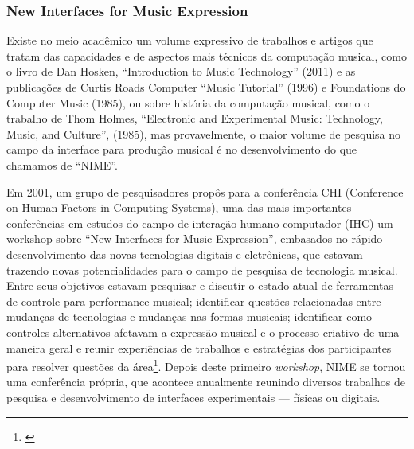 {%

\subsubsection{New Interfaces for Music Expression}



Existe no meio acadêmico um volume expressivo de trabalhos e artigos que tratam das capacidades e de aspectos mais técnicos da computação musical, como o livro de Dan Hosken, ``Introduction to Music Technology'' (2011) e as publicações de Curtis Roads Computer ``Music Tutorial'' (1996) e Foundations do Computer Music (1985), ou sobre história da computação musical, como o trabalho de Thom Holmes, ``Electronic and Experimental Music: Technology, Music, and Culture'', (1985), mas provavelmente, o maior volume de pesquisa no campo da interface para produção musical é no desenvolvimento do que chamamos de ``NIME''. 

Em 2001, um grupo de pesquisadores propôs para a conferência CHI (Conference on Human Factors in Computing Systems), uma das mais importantes conferências em estudos do campo de interação humano computador (IHC) um workshop sobre ``New Interfaces for Music Expression'', embasados no rápido desenvolvimento das novas tecnologias digitais e eletrônicas, que estavam trazendo novas potencialidades para o campo de pesquisa de tecnologia musical. Entre seus objetivos estavam pesquisar e discutir o estado atual de ferramentas de controle para performance musical; identificar questões relacionadas entre mudanças de tecnologias e mudanças nas formas musicais; identificar como controles alternativos afetavam a expressão musical e o processo criativo de uma maneira geral e reunir experiências de trabalhos e estratégias dos participantes para resolver questões da área\footnote{\cite{Poupyrev2001}}. Depois deste primeiro \emph{workshop}, NIME se tornou uma conferência própria, que acontece anualmente reunindo diversos trabalhos de pesquisa e desenvolvimento de interfaces experimentais --- físicas ou digitais. 


}
